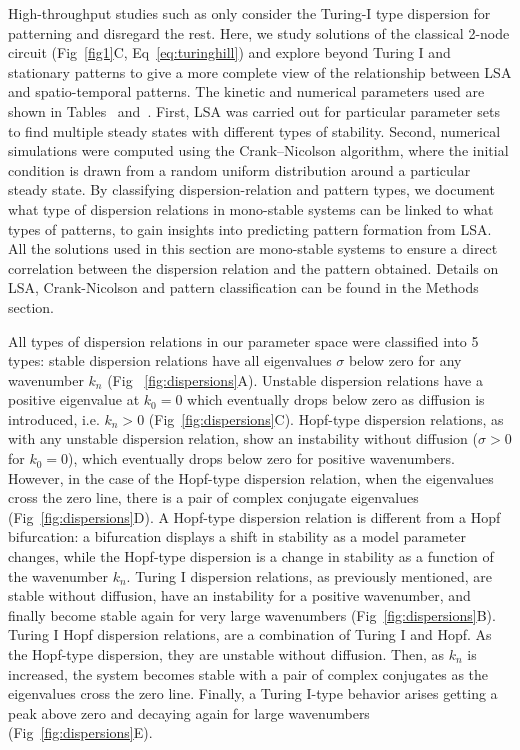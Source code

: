 \documentclass[10pt,letterpaper]{article}
\begin{document}
High-throughput studies such as \cite{Scholes2019, Zheng2016, Marcon} only consider the Turing-I type dispersion for patterning and disregard the rest.
Here, we study solutions of the classical 2-node circuit (Fig~\ref{fig1}C, Eq~\ref{eq:turinghill}) and explore beyond Turing I and stationary patterns to give a more complete view of the relationship between LSA and spatio-temporal patterns. 
The kinetic and numerical parameters used are shown in Tables~ and~.
First, LSA was carried out for particular parameter sets to find multiple steady states with different types of stability.
Second, numerical simulations were computed using the Crank–Nicolson algorithm, where the initial condition is drawn from a random uniform distribution around a particular steady state. By classifying dispersion-relation and pattern types, we document what type of dispersion relations in mono-stable systems can be linked to what types of patterns, to gain insights into predicting pattern formation from LSA. All the solutions used in this section are mono-stable systems to ensure a direct correlation between the dispersion relation and the pattern obtained. Details on LSA, Crank-Nicolson and pattern classification can be found in the Methods section.

All types of dispersion relations in our parameter space were classified into 5 types: stable dispersion relations have all eigenvalues $\sigma$ below zero for any wavenumber $k_{n}$ (Fig ~\ref{fig:dispersions}A). Unstable dispersion relations have a positive eigenvalue at $k_{0}=0$ which eventually drops below zero as diffusion is introduced, i.e. $k_{n}>0$ (Fig~\ref{fig:dispersions}C). Hopf-type dispersion relations, as with any unstable dispersion relation, show an instability without diffusion ($\sigma>0$ for $k_{0}=0$), which eventually drops below zero for positive wavenumbers. However, in the case of the Hopf-type dispersion relation, when the eigenvalues cross the zero line, there is a pair of complex conjugate eigenvalues (Fig~\ref{fig:dispersions}D).
A Hopf-type dispersion relation is different from a Hopf bifurcation: a bifurcation displays a shift in stability as a model parameter changes, while the Hopf-type dispersion is a change in stability as a function of the wavenumber $k_{n}$.
Turing I dispersion relations, as previously mentioned, are stable without diffusion, have an instability for a positive wavenumber, and finally become stable again for very large wavenumbers (Fig~\ref{fig:dispersions}B).
Turing I Hopf dispersion relations, are a combination of Turing I and Hopf. As the Hopf-type dispersion, they are unstable without diffusion. Then, as $k_{n}$ is increased, the system becomes stable with a pair of complex conjugates as the eigenvalues cross the zero line.
Finally, a Turing I-type behavior arises getting a peak above zero and decaying again for large wavenumbers (Fig~\ref{fig:dispersions}E).
\end{document}
